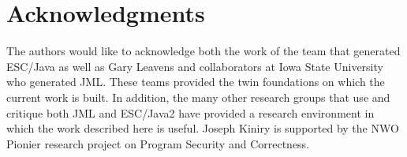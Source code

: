 \documentclass{acm_proc_article-sp}
\begin{document}
\section{Acknowledgments}
The authors would like to acknowledge both the work of the team that
generated ESC/Java as well as Gary Leavens and collaborators at Iowa
State University who generated JML.  These teams provided the twin
foundations on which the current work is built.  In addition, the many
other research groups that use and critique both JML and ESC/Java2
have provided a research environment in which the work described here
is useful.  Joseph Kiniry is supported by the NWO Pionier research
project on Program Security and Correctness.

%

  
%
%
\balancecolumns

\end{document}
